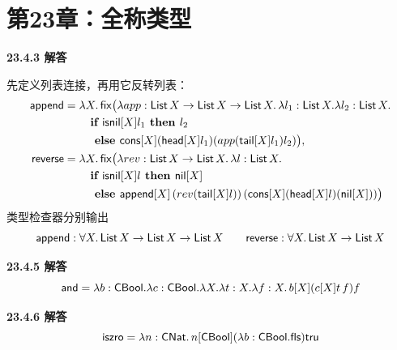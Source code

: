 \newpage
\section{第23章：全称类型}

\begin{taplauthorsolutionentrybox}
\label{sol:author:23.4.3}
\textbf{23.4.3 解答}

先定义列表连接，再用它反转列表：
\[
\begin{aligned}
\mathsf{append}={}&\lambda X.\,
\mathsf{fix}\bigl(\lambda app:
\mathsf{List}\,X\to\mathsf{List}\,X\to\mathsf{List}\,X.\,
\lambda l_1:\mathsf{List}\,X.\lambda l_2:\mathsf{List}\,X.\\
&\quad\textbf{if }\mathsf{isnil}[X]l_1\textbf{ then }l_2\\
&\quad\textbf{ else }\mathsf{cons}[X](\mathsf{head}[X]l_1)
  (app(\mathsf{tail}[X]l_1)l_2)\bigr),\\
\mathsf{reverse}={}&\lambda X.\,
\mathsf{fix}\bigl(\lambda rev:\mathsf{List}\,X\to\mathsf{List}\,X.\,
\lambda l:\mathsf{List}\,X.\\
&\quad\textbf{if }\mathsf{isnil}[X]l
\textbf{ then }\mathsf{nil}[X]\\
&\quad\textbf{ else }\mathsf{append}[X]\,
  (rev(\mathsf{tail}[X]l))\,
  (\mathsf{cons}[X](\mathsf{head}[X]l)(\mathsf{nil}[X]))\bigr)
\end{aligned}
\]
类型检查器分别输出
\[
\mathsf{append}:
\forall X.\,\mathsf{List}\,X\to\mathsf{List}\,X\to\mathsf{List}\,X
\qquad
\mathsf{reverse}:
\forall X.\,\mathsf{List}\,X\to\mathsf{List}\,X
\]
\end{taplauthorsolutionentrybox}

\begin{taplauthorsolutionentrybox}
\label{sol:author:23.4.5}
\textbf{23.4.5 解答}
\[
\mathsf{and}=\lambda b:\mathsf{CBool}.\lambda c:\mathsf{CBool}.
\lambda X.\lambda t:X.\lambda f:X.\,b[X](c[X]t\,f)f
\]
\end{taplauthorsolutionentrybox}

\begin{taplauthorsolutionentrybox}
\label{sol:author:23.4.6}
\textbf{23.4.6 解答}
\[
\mathsf{iszro}=\lambda n:\mathsf{CNat}.\,
n[\mathsf{CBool}](\lambda b:\mathsf{CBool}.\mathsf{fls})
\mathsf{tru}
\]
\end{taplauthorsolutionentrybox}


